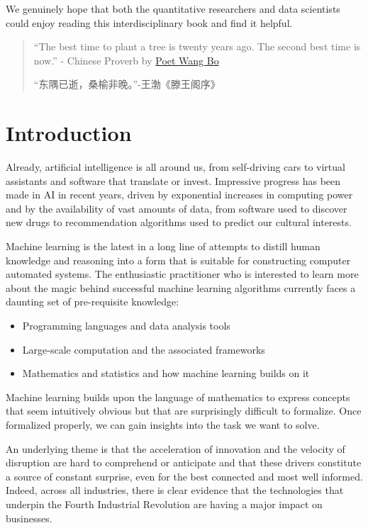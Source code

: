 \documentclass[
]{book}
\begin{document}
We genuinely hope that both the quantitative researchers and data scientists could enjoy reading this interdisciplinary book and find it helpful.

\begin{quote}
``The best time to plant a tree is twenty years ago. The second best time is now.'' - Chinese Proverb by \href{https://en.wikipedia.org/wiki/Wang_Bo_(poet)}{Poet Wang Bo}

``东隅已逝，桑榆非晚。''-王渤《滕王阁序》
\end{quote}

\hypertarget{intro}{%
\chapter{Introduction}\label{intro}}

Already, artificial intelligence is all around us, from self-driving cars to virtual assistants and software that translate or invest. Impressive progress has been made in AI in recent years, driven by exponential increases in computing power and by the availability of vast amounts of data, from software used to discover new drugs to recommendation algorithms used to predict our cultural interests.

Machine learning is the latest in a long line of attempts to distill human knowledge and reasoning into a form that is suitable for constructing computer automated systems. The enthusiastic practitioner who is interested to learn more about the magic behind successful machine learning algorithms currently faces a daunting set of pre-requisite knowledge:

\begin{itemize}
\item
  Programming languages and data analysis tools
\item
  Large-scale computation and the associated frameworks
\item
  Mathematics and statistics and how machine learning builds on it
\end{itemize}

Machine learning builds upon the language of mathematics to express concepts that seem intuitively obvious but that are surprisingly difficult to formalize. Once formalized properly, we can gain insights into the task we want to solve.

An underlying theme is that the acceleration of innovation and the velocity of disruption are hard to comprehend or anticipate and that these drivers constitute a source of constant surprise, even for the best connected and most well informed. Indeed, across all industries, there is clear evidence that the technologies that underpin the Fourth Industrial Revolution are having a major impact on businesses.
\end{document}
